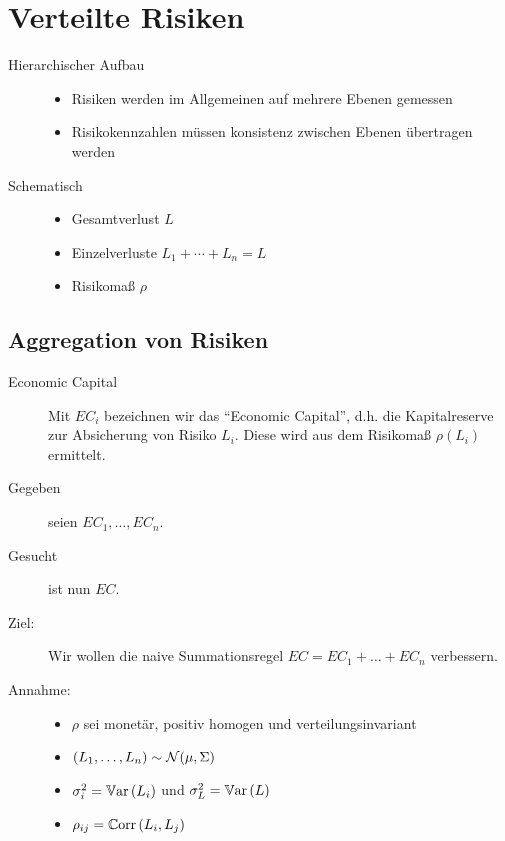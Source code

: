 \section{Verteilte Risiken}

\begin{description}
	\item[Hierarchischer Aufbau]
	
	\begin{itemize}[nolistsep]
		\item Risiken werden im Allgemeinen auf mehrere Ebenen gemessen
		\item Risikokennzahlen müssen konsistenz zwischen Ebenen übertragen werden
	\end{itemize}
	
	\item[Schematisch]
	\begin{itemize}[nolistsep]
		\item Gesamtverlust $L$
		\item Einzelverluste $L_1 + \cdots + L_n = L$
		\item Risikomaß $\rho$
	\end{itemize}
\end{description}


\subsection{Aggregation von Risiken}
\begin{description}
	\item[Economic Capital] Mit $EC_i$ bezeichnen wir das \enquote{Economic Capital}, d.h. die Kapitalreserve zur Absicherung von Risiko $L_i$. Diese wird aus dem Risikomaß $\rho(L_i)$ ermittelt.
	
	\item[Gegeben] seien $EC_1, \dots, EC_n$. 
	\item[Gesucht] ist nun $EC$.
	
	\item[Ziel:] Wir wollen die naive Summationsregel $EC = EC_1 + \dots + EC_n$ verbessern.
	
	\item[Annahme:] 
	\begin{itemize}[nolistsep]
		\item[] $\rho$ sei monetär, positiv homogen und verteilungsinvariant
		\item[] $(L_1, \dots, L_n) \sim \Normal(\mu, \Sigma)$
		\item[] $\sigma_i^2 = \Var[L_i]$ und $\sigma_L^2 = \Var[L]$
		\item[] $\rho_{ij} = \Corr{L_i}{L_j}$
	\end{itemize}
\end{description}


